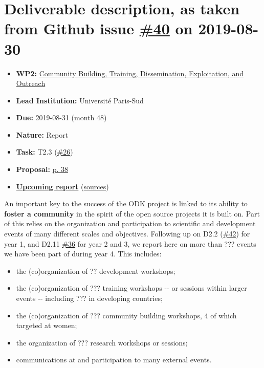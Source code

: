 \hypertarget{deliverable-description-as-taken-from-github-issue-40-on-2019-08-30}{%
\section*{\texorpdfstring{Deliverable description, as taken from Github
issue
\href{https://github.com/OpenDreamKit/OpenDreamKit/issues/40}{\#40} on
2019-08-30}{Deliverable description, as taken from Github issue \#40 on 2019-08-30}}\label{deliverable-description-as-taken-from-github-issue-40-on-2019-08-30}}

\begin{itemize}
\tightlist
\item
  \textbf{WP2:}
  \href{https://github.com/OpenDreamKit/OpenDreamKit/tree/master/WP2}{Community
  Building, Training, Dissemination, Exploitation, and Outreach}
\item
  \textbf{Lead Institution:} Université Paris-Sud
\item
  \textbf{Due:} 2019-08-31 (month 48)
\item
  \textbf{Nature:} Report
\item
  \textbf{Task:} T2.3
  (\href{https://github.com/OpenDreamKit/OpenDreamKit/issues/26}{\#26})
\item
  \textbf{Proposal:}
  \href{https://github.com/OpenDreamKit/OpenDreamKit/raw/master/Proposal/proposal-www.pdf}{p.
  38}
\item
  \textbf{\href{https://github.com/OpenDreamKit/OpenDreamKit/raw/master/WP2/D2.15/report-final.pdf}{Upcoming
  report}}
  (\href{https://github.com/OpenDreamKit/OpenDreamKit/raw/master/WP2/D2.15/}{sources})
\end{itemize}

An important key to the success of the ODK project is linked to its
ability to \textbf{foster a community} in the spirit of the open source
projects it is built on. Part of this relies on the organization and
participation to scientific and development events of many different
scales and objectives. Following up on D2.2
(\href{https://github.com/OpenDreamKit/OpenDreamKit/issues/42}{\#42})
for year 1, and D2.11
\href{https://github.com/OpenDreamKit/OpenDreamKit/issues/36}{\#36} for
year 2 and 3, we report here on more than ??? events we have been part
of during year 4. This includes:

\begin{itemize}
\tightlist
\item
  the (co)organization of ?? development workshops;
\item
  the (co)organization of ??? training workshops -\/- or sessions within
  larger events -\/- including ??? in developing countries;
\item
  the (co)organization of ??? community building workshops, 4 of which
  targeted at women;
\item
  the organization of ??? research workshops or sessions;
\item
  communications at and participation to many external events.
\end{itemize}

